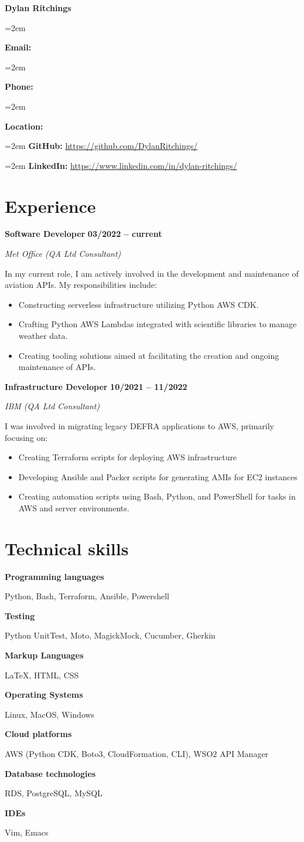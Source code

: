 \documentclass[12pt]{article}
\newlength{\spacebox}
\newcommand{\sepspace}{\vspace*{1em}}
\newcommand{\name}[1]{
\Huge 
\begin{center} \textbf{#1} \end{center}\par
\normalsize}
\newcommand{\info}[2]{
  \noindent\hangindent=2em\hangafter=0
  \parbox{\spacebox}{
    \textbf{#1:}} #2 \par
  }
\newcommand{\link}[2]{
  \noindent\hangindent=2em\hangafter=0
  \textbf{#1:} \url{#2} \par
  }
\newcommand{\skill}[2]{
\noindent\hangafter=0
\begin{minipage}[t]{0.31\textwidth}
  \textbf{#1} 
  \end{minipage}
  \hfill 
  \begin{minipage}[t]{0.6\textwidth}
      #2
  \end{minipage}
  \par
  \vspace*{0.5em}} %
\newcommand{\work}[4]{
  \noindent  \textbf{#1}
  \hfill 
  {
  \centering\textbf{#2}} \par
  \noindent \textit{#3} \par
  \vspace*{0.3em}
  \noindent\hangafter=0 \small #4 
\normalsize \par}
\begin{document}
\name{Dylan Ritchings}
\vspace*{-10pt}

\sepspace
\info{Email}{}
\info{Phone}{}
\info{Location}{}

\sepspace
\link{GitHub}{https://github.com/DylanRitchings/}
\link{LinkedIn}{https://www.linkedin.com/in/dylan-ritchings/}

\section*{Experience}

\work{Software Developer}{03/2022 -- current}{Met Office (QA Ltd Consultant)}
{In my current role, I am actively involved in the development and maintenance of aviation APIs. My responsibilities include:

\begin{itemize}
  \item Constructing serverless infrastructure utilizing Python AWS CDK.
  \item Crafting Python AWS Lambdas integrated with scientific libraries to manage weather data.
  \item Creating tooling solutions aimed at facilitating the creation and ongoing maintenance of APIs.
\end{itemize}}

\sepspace

\work{Infrastructure Developer}{10/2021 -- 11/2022}{IBM (QA Ltd Consultant)}
{I was involved in migrating legacy DEFRA applications to AWS, primarily focusing on:
\begin{itemize}
    \item Creating Terraform scripts for deploying AWS infrastructure
    \item Developing Ansible and Packer scripts for generating AMIs for EC2 instances
    \item Creating automation scripts using Bash, Python, and PowerShell for tasks in AWS and server environments.
\end{itemize}}

\section*{Technical skills}

\skill{Programming languages}{Python, Bash, Terraform, Ansible, Powershell}
\skill{Testing}{Python UnitTest, Moto, MagickMock, Cucumber, Gherkin}
\skill{Markup Languages}{\LaTeX, HTML, CSS}
\skill{Operating Systems}{Linux, MacOS, Windows}
\skill{Cloud platforms}{AWS (Python CDK, Boto3, CloudFormation, CLI), WSO2 API Manager}
\skill{Database technologies}{RDS, PostgreSQL, MySQL}
\skill{IDEs}{Vim, Emacs}
\end{document}
